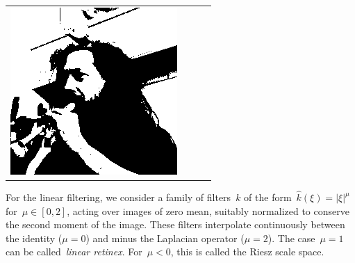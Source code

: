 \begin{tabular}{llll}
	\includegraphics{weiro-ditanhi.png} \\
\end{tabular}

For the linear filtering, we consider a family of filters~$k$ of the
form~$\widehat{k}(\xi)=|\xi|^\mu$ for~$\mu\in[0,2]$, acting over images of
zero mean, suitably normalized to conserve the second moment of the image.
These filters interpolate continuously between the identity ($\mu=0$) and
minus the Laplacian operator ($\mu=2$).  The case~$\mu=1$ can be
called~\emph{linear retinex}.  For~$\mu<0$, this is called the Riesz scale
space.


